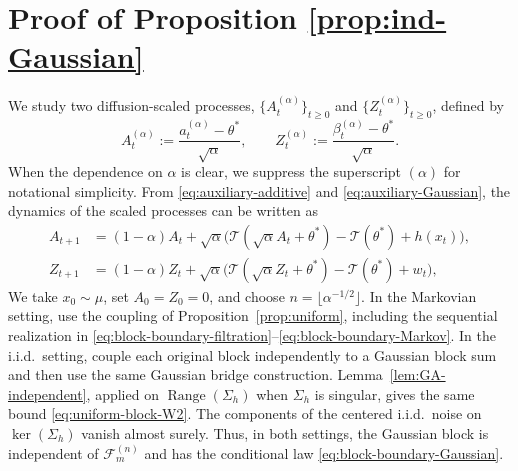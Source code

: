 \documentclass[11pt,letterpaper]{article}
\theoremstyle{plain}
\theoremstyle{definition}
\theoremstyle{remark}
\newcommand{\mT}{\mathcal{T}}
\begin{document}
\section{Proof of Proposition \ref{prop:ind-Gaussian}}\label{sec:proof-universal-noise}
We study two diffusion-scaled processes,
\(\{A_t^{(\alpha)}\}_{t\ge 0}\) and
\(\{Z_t^{(\alpha)}\}_{t\ge 0}\), defined by
\[
A_t^{(\alpha)}
:=
\frac{a_t^{(\alpha)}-\theta^*}{\sqrt{\alpha}},
\qquad
Z_t^{(\alpha)}
:=
\frac{\beta_t^{(\alpha)}-\theta^*}{\sqrt{\alpha}}.
\]
When the dependence on \(\alpha\) is clear, we suppress the
superscript \((\alpha)\) for notational simplicity. From \eqref{eq:auxiliary-additive} and \eqref{eq:auxiliary-Gaussian}, the dynamics of the scaled processes
can be written as
\begin{equation}\label{eq: additive different noise}
\begin{aligned}
A_{t+1} &= (1-\alpha)A_t + \sqrt{\alpha}\big(\mT(\sqrt{\alpha} A_t + \theta^*) - \mT(\theta^*) + h(x_t)\big),\\
Z_{t+1}  &= (1-\alpha)Z_t  + \sqrt{\alpha}\big(\mT(\sqrt{\alpha} Z_t  + \theta^*) - \mT(\theta^*) + w_t\big),
\end{aligned}
\end{equation}
We take \(x_0\sim\mu\), set \(A_0=Z_0=0\), and choose
\(n=\lfloor\alpha^{-1/2}\rfloor\). In the Markovian setting, use the
coupling of Proposition~\ref{prop:uniform}, including the sequential
realization in \eqref{eq:block-boundary-filtration}--\eqref{eq:block-boundary-Markov}. In the i.i.d.\ setting, couple each
original block independently to a Gaussian block sum and then use the
same Gaussian bridge construction. Lemma~\ref{lem:GA-independent},
applied on \(\operatorname{Range}(\Sigma_h)\) when \(\Sigma_h\) is
singular, gives the same bound \eqref{eq:uniform-block-W2}. The components
of the centered i.i.d.\ noise on \(\ker(\Sigma_h)\) vanish almost surely.
Thus, in both settings, the Gaussian block is independent of
\(\mathcal F_m^{(n)}\) and has the conditional law
\eqref{eq:block-boundary-Gaussian}.
\end{document}
